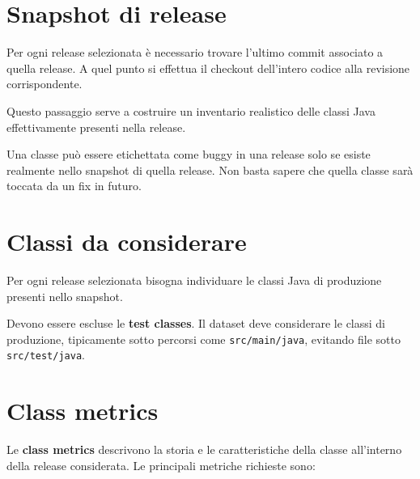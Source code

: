 \section{Snapshot di release}

Per ogni release selezionata è necessario trovare l'ultimo commit associato a quella release. A quel punto si effettua il checkout dell'intero codice alla revisione corrispondente.

Questo passaggio serve a costruire un inventario realistico delle classi Java effettivamente presenti nella release.

\begin{notaprof}
Una classe può essere etichettata come buggy in una release solo se esiste realmente nello snapshot di quella release. Non basta sapere che quella classe sarà toccata da un fix in futuro.
\end{notaprof}

\section{Classi da considerare}

Per ogni release selezionata bisogna individuare le classi Java di produzione presenti nello snapshot.

\begin{notaesame}
Devono essere escluse le \textbf{test classes}. Il dataset deve considerare le classi di produzione, tipicamente sotto percorsi come \texttt{src/main/java}, evitando file sotto \texttt{src/test/java}.
\end{notaesame}

\section{Class metrics}

Le \textbf{class metrics} descrivono la storia e le caratteristiche della classe all'interno della release considerata. Le principali metriche richieste sono:

